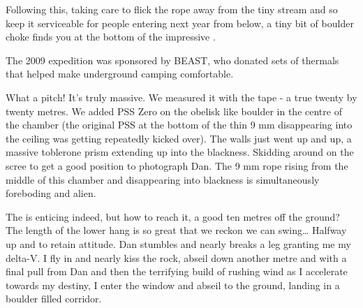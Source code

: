 Following this, taking care to flick the rope away from the tiny stream
and so keep it serviceable for people entering next year from below, a
tiny bit of boulder choke finds you at the bottom of the impressive
.


\begin{pagefigure}
\checkoddpage \ifoddpage \forcerectofloat \else \forceversofloat \fi
\centering
 \caption{The 2009 expedition was sponsored by BEAST, who donated sets of thermals that helped make underground camping comfortable. }
 \label{beast thermals}
\end{pagefigure}


What a pitch! It's truly massive. We measured it with the tape - a true
twenty by twenty metres. We added PSS Zero on the obelisk like boulder
in the centre of the chamber (the original PSS at the bottom of the thin
9 mm disappearing into the ceiling was getting repeatedly kicked over).
The walls just went up and up, a massive toblerone prism extending up
into the blackness. Skidding around on the scree to get a good position
to photograph Dan. The 9 mm rope rising from the middle of this chamber
and disappearing into blackness is simultaneously foreboding and alien.

The  is enticing indeed, but how to reach it, a good
ten metres off the ground? The length of the lower hang is so great that
we reckon we can swing\ldots{} Halfway up and  to retain attitude. Dan stumbles and nearly breaks a leg granting
me my delta-V. I fly in and nearly kiss the rock, abseil down another
metre and with a final pull from Dan and then the terrifying build of
rushing wind as I accelerate towards my destiny, I enter the window and
abseil to the ground, landing in a boulder filled corridor.

